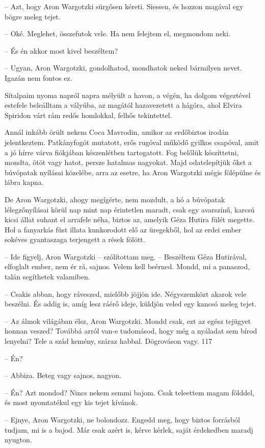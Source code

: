 \documentclass{IEEEtran}
\begin{document}
– Azt, hogy Aron Wargotzki sürgősen kéreti. Siessen, és hozzon magával egy
bögre meleg tejet.

– Oké. Meglehet, összefutok vele. Ha nem felejtem el, megmondom neki.

– És én akkor most kivel beszéltem?

– Ugyan, Aron Wargotzki, gondolhatod, mondhatok neked bármilyen nevet. Igazán
nem fontos ez.

Sítalpaim nyoma napról napra mélyült a havon, a végén, ha dolgom végeztével
estefele beleálltam a vályúba, az magától hazavezetett a hágóra, ahol Elvira
Spiridon várt rám redős homlokkal, felhős tekintettel.

Annál inkább örült nekem Coca Mavrodin, amikor az erdőbiztos irodán
jelentkeztem. Patkányfogót mutatott, erős rugóval működő gyilkos csapóval,
amit a jó hírre várva fiókjában készenlétben tartogatott. Fog belőlük
készíttetni, mondta, ötöt vagy hatot, persze hatalmas nagyokat. Majd
odatelepítjük őket a búvópatak nyílásai közelébe, arra az esetre, ha Aron
Wargotzki mégis fölépülne és lábra kapna.

De Aron Wargotzki, ahogy megígérte, nem mozdult, a hó a búvópatak
lélegzőnyílásai körül nap mint nap érintetlen maradt, csak egy avarszínű,
karcsú kicsi állat suhant el arrafele néha, biztos az, amelyik Géza Hutira
fülét megette. Hol a fanyarkás füst illata kunkorodott elő az üregekből, hol
az erdei ember sokéves gyantaszaga terjengett a rések fölött.

– Ide figyelj, Aron Wargotzki – szólítottam meg. – Beszéltem Géza Hutirával,
elfoglalt ember, nem ér rá, sajnos. Velem kell beérned. Mondd, mi a panaszod,
talán segíthetek valamiben.

– Csakis abban, hogy ráveszed, mielőbb jöjjön ide. Négyszemközt akarok vele
beszélni. És addig is, amíg lesz ráérő ideje, küldjön veled egy kancsó meleg
tejet.

– Az álmok világában élsz, Aron Wargotzki. Mondd csak, ezt az egész tejügyet
honnan veszed? Továbbá arról van-e tudomásod, hogy még a nyáladat sem bírod
lenyelni? Tele a szád kemény, száraz habbal. Dögrováson vagy.
117

– Én?

– Abbiza. Beteg vagy sajnos, nagyon.

– Én? Azt mondod? Nincs nekem semmi bajom. Csak teleettem magam földdel, és
most nyomtatékul egy kis tejet kívánok.

– Ejnye, Aron Wargotzki, ne bolondozz. Engedd meg, hogy biztos forrásból
tudjam, mi is a bajod. Már csak azért is, kérve kérlek, saját érdekedben
maradj nyugton.
\end{document}
